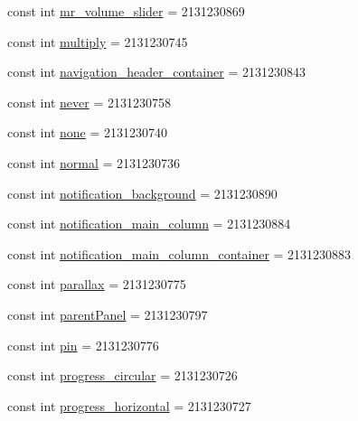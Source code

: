 \begin{DoxyCompactItemize}
\item 
const int \mbox{\hyperlink{class_f_w_p_s___app_1_1_droid_1_1_resource_1_1_id_a30b3c87ba5fa7f7d412f6053475d8138}{mr\+\_\+volume\+\_\+slider}} = 2131230869
\item 
const int \mbox{\hyperlink{class_f_w_p_s___app_1_1_droid_1_1_resource_1_1_id_a754e7ac7f6404b0027c43c8b8674368b}{multiply}} = 2131230745
\item 
const int \mbox{\hyperlink{class_f_w_p_s___app_1_1_droid_1_1_resource_1_1_id_aa1dd351c78406630359106482fd4f663}{navigation\+\_\+header\+\_\+container}} = 2131230843
\item 
const int \mbox{\hyperlink{class_f_w_p_s___app_1_1_droid_1_1_resource_1_1_id_a5eaf63b0abec1b4735c5ac4c115b4e28}{never}} = 2131230758
\item 
const int \mbox{\hyperlink{class_f_w_p_s___app_1_1_droid_1_1_resource_1_1_id_a5c04f8f2957c0b2926be1c484f66634d}{none}} = 2131230740
\item 
const int \mbox{\hyperlink{class_f_w_p_s___app_1_1_droid_1_1_resource_1_1_id_a6e1397ae048595a51745a783a87a8ea4}{normal}} = 2131230736
\item 
const int \mbox{\hyperlink{class_f_w_p_s___app_1_1_droid_1_1_resource_1_1_id_a80a962acaf36a99333c6af4449bfff26}{notification\+\_\+background}} = 2131230890
\item 
const int \mbox{\hyperlink{class_f_w_p_s___app_1_1_droid_1_1_resource_1_1_id_a3957f3c59d9c1100abe1c37a633ad0ae}{notification\+\_\+main\+\_\+column}} = 2131230884
\item 
const int \mbox{\hyperlink{class_f_w_p_s___app_1_1_droid_1_1_resource_1_1_id_a3181ea9782b1160c5869e0f409f67b3a}{notification\+\_\+main\+\_\+column\+\_\+container}} = 2131230883
\item 
const int \mbox{\hyperlink{class_f_w_p_s___app_1_1_droid_1_1_resource_1_1_id_a4b9b857fab6d838926a7db8c0ac89e23}{parallax}} = 2131230775
\item 
const int \mbox{\hyperlink{class_f_w_p_s___app_1_1_droid_1_1_resource_1_1_id_a690203f17db2646e0a2d436606ee5066}{parent\+Panel}} = 2131230797
\item 
const int \mbox{\hyperlink{class_f_w_p_s___app_1_1_droid_1_1_resource_1_1_id_ad28d561d53468a5ef996c55244328359}{pin}} = 2131230776
\item 
const int \mbox{\hyperlink{class_f_w_p_s___app_1_1_droid_1_1_resource_1_1_id_aca6deb9113d847c94967be0c978a9199}{progress\+\_\+circular}} = 2131230726
\item 
const int \mbox{\hyperlink{class_f_w_p_s___app_1_1_droid_1_1_resource_1_1_id_a1003a087fc1df5b3936d951fbd3f42f6}{progress\+\_\+horizontal}} = 2131230727

\end{DoxyCompactItemize}

